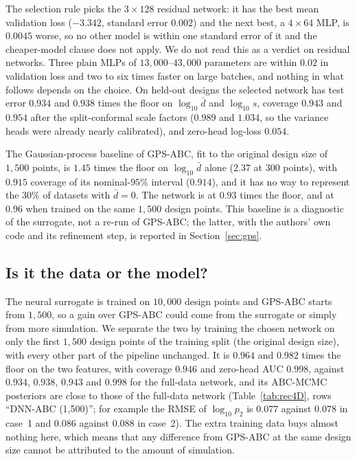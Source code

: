 \documentclass[sn-basic,iicol,pdflatex]{sn-jnl}
\begin{document}
The selection rule picks the $3\times128$ residual network: it has the best mean validation loss
($-3.342$, standard error $0.002$) and the next best, a $4\times64$ MLP, is $0.0045$ worse,
so no other model is within one standard error of it and the cheaper-model clause does not apply. We do not read this as a verdict on residual
networks. Three plain MLPs of $13{,}000$--$43{,}000$ parameters are within $0.02$ in
validation loss and two to six times faster on large batches, and nothing in what follows
depends on the choice. On held-out designs the selected network has test error
$0.934$ and $0.938$ times the floor on $\log_{10}\bar d$ and $\log_{10}s$, coverage
$0.943$ and $0.954$ after the split-conformal scale factors ($0.989$ and $1.034$, so the variance
heads were already nearly calibrated), and zero-head log-loss $0.054$.

The Gaussian-process baseline of GPS-ABC, fit to the original design size of $1{,}500$ points, is $1.45$ times the
floor on $\log_{10}\bar d$ alone ($2.37$ at $300$ points), with $0.915$ coverage of its nominal-$95\%$
interval ($0.914$), and it has no way to represent the $30\%$ of datasets with $\bar d=0$. The network is at $0.93$
times the floor, and at $0.96$ when trained on the same $1{,}500$ design points. This
baseline is a diagnostic of the surrogate, not a re-run of GPS-ABC; the latter, with the
authors' own code and its refinement step, is reported in Section~\ref{sec:gps}.

\subsection{Is it the data or the model?}
\label{sec:matched}

The neural surrogate is trained on $10{,}000$ design points and GPS-ABC starts from
$1{,}500$, so a gain over GPS-ABC could come from the surrogate or simply from more
simulation. We separate the two by training the chosen network on only the first $1{,}500$ design points
of the training split (the original design size), with every other part of the pipeline unchanged. It
is $0.964$ and $0.982$ times the floor on the two features, with coverage $0.946$ and zero-head AUC $0.998$,
against $0.934$, $0.938$, $0.943$ and $0.998$ for the full-data network, and its
ABC-MCMC posteriors are close to those of the full-data network (Table~\ref{tab:rec4D}, rows ``DNN-ABC (1,500)''; for example the RMSE of $\log_{10}p_2$ is
$0.077$ against $0.078$ in case~1 and $0.086$ against $0.088$ in case~2). The extra training data
buys almost nothing here, which means that any difference from GPS-ABC at the same
design size cannot be attributed to the amount of simulation.
\end{document}

